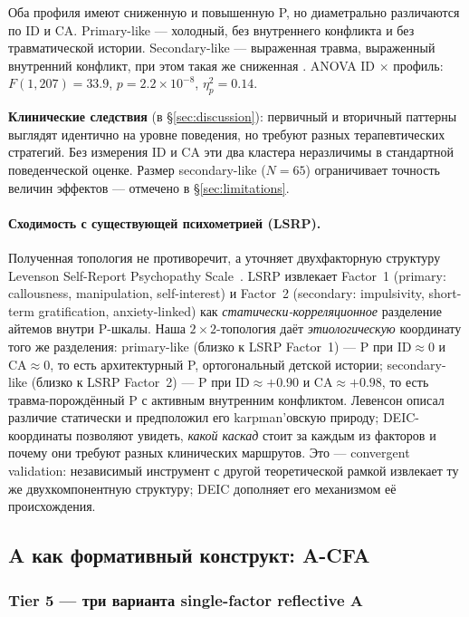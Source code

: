 Оба профиля имеют сниженную \EAF{} и повышенную P, но диаметрально различаются по ID и CA. Primary-like --- холодный, без внутреннего конфликта и без травматической истории. Secondary-like --- выраженная травма, выраженный внутренний конфликт, при этом такая же сниженная \EAF{}. ANOVA ID $\times$ профиль: $F(1, 207) = 33.9$, $p = 2.2 \times 10^{-8}$, $\eta^2_p = 0.14$.

\textbf{Клинические следствия} (в §\ref{sec:discussion}): первичный и вторичный паттерны выглядят идентично на уровне поведения, но требуют разных терапевтических стратегий. Без измерения ID и CA эти два кластера неразличимы в стандартной поведенческой оценке. Размер secondary-like ($N = 65$) ограничивает точность величин эффектов --- отмечено в §\ref{sec:limitations}.

\paragraph{Сходимость с существующей психометрией (LSRP).} Полученная топология не противоречит, а уточняет двухфакторную структуру Levenson Self-Report Psychopathy Scale~\citep{levenson1995}. LSRP извлекает Factor~1 (primary: callousness, manipulation, self-interest) и Factor~2 (secondary: impulsivity, short-term gratification, anxiety-linked) как \emph{статически-корреляционное} разделение айтемов внутри P-шкалы. Наша $2 \times 2$-топология даёт \emph{этиологическую} координату того же разделения: primary-like (близко к LSRP Factor~1) --- P при $\text{ID} \approx 0$ и $\text{CA} \approx 0$, то есть архитектурный P, ортогональный детской истории; secondary-like (близко к LSRP Factor~2) --- P при $\text{ID} \approx +0.90$ и $\text{CA} \approx +0.98$, то есть травма-порождённый P с активным внутренним конфликтом. Левенсон описал различие статически и предположил его karpman'овскую природу; DEIC-координаты позволяют увидеть, \emph{какой каскад} стоит за каждым из факторов и почему они требуют разных клинических маршрутов. Это --- convergent validation: независимый инструмент с другой теоретической рамкой извлекает ту же двухкомпонентную структуру; DEIC дополняет его механизмом её происхождения.

\subsection{A как формативный конструкт: A-CFA}
\label{subsec:a_cfa}

\subsubsection{Tier 5 --- три варианта single-factor reflective A}

